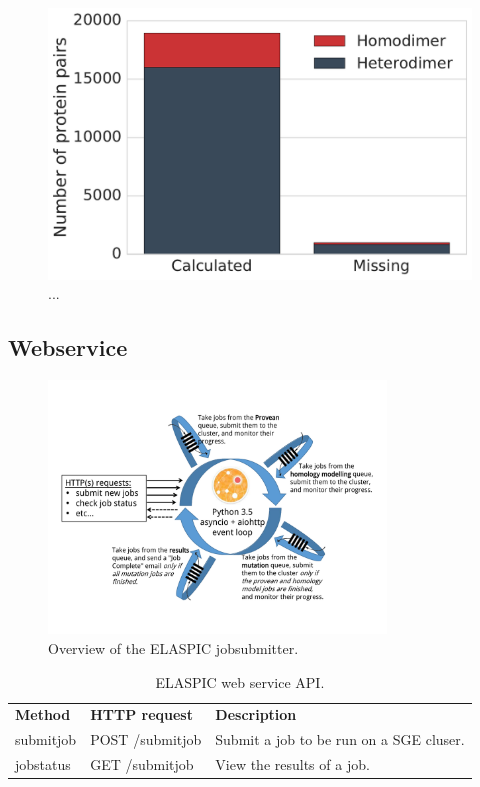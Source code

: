 \begin{figure}[ht]
	\centering
	\includegraphics[width=0.4\linewidth]{static/elaspic_training_set/elaspic_statistics/missing_model_protein_pair_novarsplice.pdf}
	\caption{...}
\end{figure}



\subsection{Webservice}

\begin{figure}[ht]
	\centering
	\includegraphics[width=0.8\textwidth]{static/elaspic/elaspic_jobsubmitter.pdf}
	\caption[ELASPIC jobsubmitter]{Overview of the ELASPIC jobsubmitter.}
	\label{fig:elaspic_jobsubmitter}
\end{figure}


\begin{table}[ht]
	\centering
	\caption{ELASPIC web service API.}
	\label{tab:elaspic_jobsubmitter}
	\begin{tabular}{lll}
	\textbf{Method} & \textbf{HTTP request} & \textbf{Description} \\
	submitjob & POST /submitjob & Submit a job to be run on a SGE cluser. \\
	jobstatus & GET /submitjob & View the results of a job.
	\end{tabular}
\end{table}
